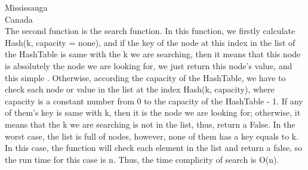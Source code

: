\documentclass{letter}
\begin{document}
\begin{letter}{Mississauga \\ Canada}
\\ The second function is the search function. In this function, we firstly calculate Hash(k, capacity = none), and if the key of the node at this index in the list of the HashTable is same with the k we are searching, then it means that this node is absolutely the node we are looking for, we just return this node's value, and this simple . Otherwise, according the capacity of the HashTable, we have to check each node or value in the list at the index Hash(k, capacity), where capacity is a constant number from 0 to the capacity of the HashTable - 1. If any of them's key is same with k, then it is the node we are looking for; otherwise, it means that the k we are searching is not in the list, thus, return a False. In the worst case, the list is full of nodes, however, none of them has a key equals to k. In this case, the function will check each element in the list and return a false, so the run time for this case is n. Thus, the time complicity of search is O(n).

\end{letter}
\end{document}
